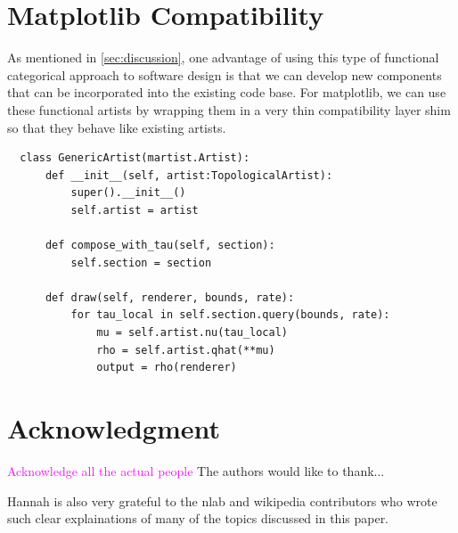 \documentclass[journal]{IEEEtran}
\newcommand{\note}[1]{\textcolor{magenta}{#1}}
\theoremstyle{definition}
\theoremstyle{remark}
\begin{document}
\pagebreak
\section{Matplotlib Compatibility}
\label{sec:appendix:artist_shim}

As mentioned in \autoref{sec:discussion}, one advantage of using this type of  
functional categorical approach to software design is that we can develop new 
components that can be incorporated into the existing code base. For matplotlib, 
we can use these functional artists by wrapping them in a very thin compatibility
layer shim so that they behave like existing artists. 

\begin{verbatim}
  class GenericArtist(martist.Artist):
      def __init__(self, artist:TopologicalArtist):
          super().__init__()
          self.artist = artist
          
      def compose_with_tau(self, section):
          self.section = section
  
      def draw(self, renderer, bounds, rate):
          for tau_local in self.section.query(bounds, rate): 
              mu = self.artist.nu(tau_local)
              rho = self.artist.qhat(**mu)
              output = rho(renderer)
  \end{verbatim}

\section*{Acknowledgment}
\note{Acknowledge all the actual people}
The authors would like to thank...

Hannah is also very grateful to the nlab and wikipedia contributors who wrote such 
clear explainations of many of the topics discussed in this paper. 

\ifCLASSOPTIONcaptionsoff
  \newpage
\fi



\end{document}
